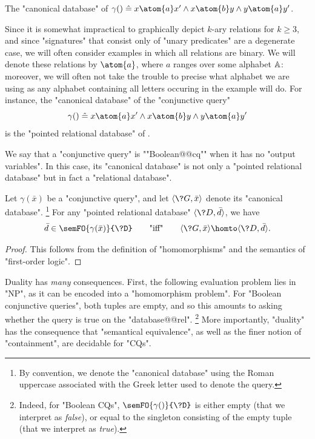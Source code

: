 \begin{marginfigure}
	\centering
	\caption{\AP\label{fig:prelim-db-ex-db}
	The "canonical database" of $\gamma() \defeq x \atom{a} x' \land x \atom{b} y \land y \atom{a} y'$.}
\end{marginfigure}
Since it is somewhat impractical to graphically depict $k$-ary relations for $k \geq 3$,
and since "signatures" that consist only of "unary predicates" are a degenerate case,
we will often consider examples in which all relations are binary.
We will denote these relations by $\atom{a}$, where $a$ ranges over some alphabet $\mathbb{A}$:
moreover, we will often not take the trouble to precise what alphabet we are using
as any alphabet containing all letters occuring in the example will do.
For instance, the "canonical database" of the "conjunctive query"
\[
	\gamma() \defeq x \atom{a} x' \land x \atom{b} y \land y \atom{a} y'
\]
is the "pointed relational database" of .

We say that a "conjunctive query" is ""Boolean@@cq"" when it has no "output variables".
In this case, its "canonical database" is not only a "pointed relational database" but
in fact a "relational database".

\begin{proposition}[""Duality""]
	\AP\label{prop:duality}
	Let $\gamma(\bar x)$ be a "conjunctive query",
	and let $\tup{\?G, \bar x}$ denote its "canonical database".%
	\footnote{By convention, we denote the "canonical database" using the Roman
	uppercase associated with the Greek letter used to denote
	the query.}
	For any "pointed relational database" $\tup{\?D, \bar d}$,
	we have
	\[
		\bar d \in \semFO{\gamma(\bar x)}{\?D}
		\qquad\text{"iff"}\qquad
		\tup{\?G, \bar x} \homto \tup{\?D, \bar d}.
	\]
\end{proposition}

\begin{proof}
	This follows from the definition of "homomorphisms" and
	the semantics of "first-order logic".
\end{proof}

Duality has \emph{many} consequences. First, the following evaluation problem
lies in "NP", as it can be encoded into a "homomorphism problem".
For "Boolean conjunctive queries", both tuples are empty, and so
this amounts to asking whether the query is true on the "database@@rel".%
\footnote{Indeed, for "Boolean CQs",
$\semFO{\gamma()}{\?D}$ is either empty (that we interpret as \emph{false}),
or equal to the singleton consisting of the empty tuple (that we interpret as \emph{true}).}
More importantly, "duality" has the consequence that
"semantical equivalence", as well as the finer notion of "containment",
are decidable for "CQs".

